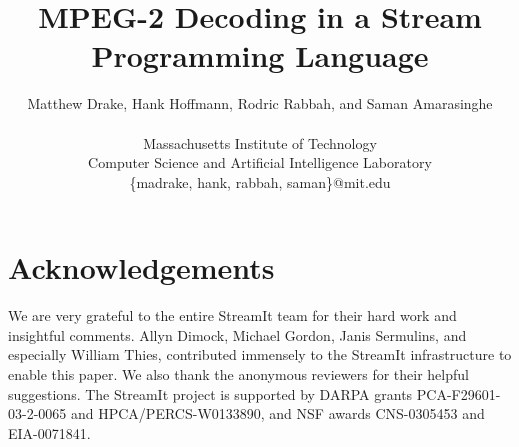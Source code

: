 \documentclass[times,10pt,twocolumn]{article}
\title{MPEG-2 Decoding in a Stream Programming Language}
\author{
  Matthew Drake, Hank Hoffmann, Rodric Rabbah, and Saman Amarasinghe\\
  \begin{twoaffiliations}
    Massachusetts Institute of Technology\\
    Computer Science and Artificial Intelligence Laboratory\\
    \{madrake, hank, rabbah, saman\}@mit.edu
  \end{twoaffiliations}
}
\begin{document}
  
  \maketitle
  \thispagestyle{empty}
  
  \begin{abstract}
    
  \end{abstract}
  
  
  
  
  
  
  
  
  
  \section*{Acknowledgements}
  \vspace{-6pt}
  We are very grateful to the entire StreamIt team for their hard work
  and insightful comments. Allyn Dimock, Michael Gordon, Janis
  Sermulins, and especially William Thies, contributed immensely to
  the StreamIt infrastructure to enable this paper. We also thank the
  anonymous reviewers for their helpful suggestions. The StreamIt
  project is supported by DARPA grants PCA-F29601-03-2-0065 and
  HPCA/PERCS-W0133890, and NSF awards CNS-0305453 and EIA-0071841.

  
  
\end{document}
